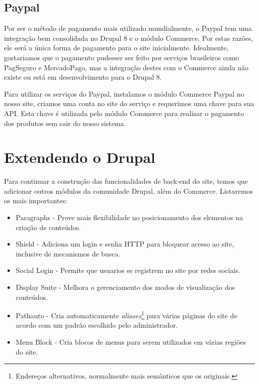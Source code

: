 \subsection{Paypal}
Por ser o método de pagamento mais utilizado mundialmente\cite{PaymentMethods}, o Paypal tem uma integração bem consolidada no Drupal 8 e o módulo Commerce. Por estas razões, ele será a única forma de pagamento para o site inicialmente. Idealmente, gostariamos que o pagamento pudesser ser feito por serviços brasileiros como PagSeguro e MercadoPago, mas a integração destes com o Commerce ainda não existe ou está em desenvolvimento para o Drupal 8.

Para utilizar os serviços do Paypal, instalamos o módulo Commerce Paypal no nosso site, criamos uma conta no site do serviço e requerimos uma chave para sua API. Esta chave é utilizada pelo módulo Commerce para realizar o pagamento dos produtos sem sair do nosso sistema.

\section{Extendendo o Drupal}

Para continuar a construção das funcionalidades de back-end do site, temos que adicionar outros módulos da comunidade Drupal, além do Commerce. Listaremos os mais importantes:

\begin{itemize}
  \item Paragraphs - Prove mais flexibilidade no posicionamento dos elementos na criação de conteúdos.
  \item Shield - Adiciona um login e senha HTTP para bloquear acesso ao site, inclusive de mecanismos de busca.
  \item Social Login - Permite que usuarios se registrem no site por redes sociais.
  \item Display Suite - Melhora o gerenciamento dos modos de visualização dos conteúdos.
  \item Pathauto - Cria automaticamente \textit{aliases}\footnote{Endereços alternativos, normalmente mais semânticos que os originais.} para várias páginas do site de acordo com um padrão escolhido pelo administrador.
  \item Menu Block - Cria blocos de menus para serem utilizados em várias regiões do site.
\end{itemize}

